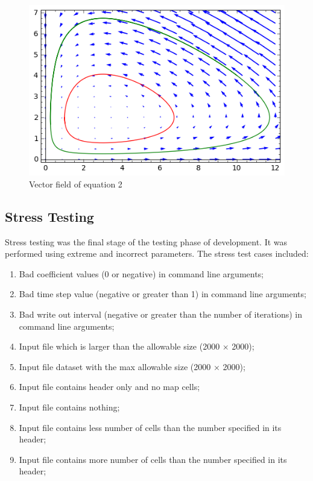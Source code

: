 \documentclass[12pt,a4paper]{article}
\begin{document}
\begin{figure}[hb]
    \centering
    \includegraphics[scale=0.75]{images/sage1.png}
    \caption{Vector field of equation 2}
\end{figure}

\clearpage

\subsection{Stress Testing}

Stress testing was the final stage of the testing phase of development. It was performed using extreme and incorrect parameters. The stress test cases included:

\begin{enumerate}

\item Bad coefficient values (0 or negative) in command line arguments;
\item Bad time step value (negative or greater than 1) in command line arguments;
\item Bad write out interval (negative or greater than the number of iterations) in command line arguments;
\item Input file which is larger than the allowable size (2000 $\times$ 2000);
\item Input file dataset with the max allowable size (2000 $\times$ 2000);
\item Input file contains header only and no map cells;
\item Input file contains nothing;
\item Input file contains less number of cells than the number specified in its header;
\item Input file contains more number of cells than the number specified in its header;

\end{enumerate}
\end{document}
